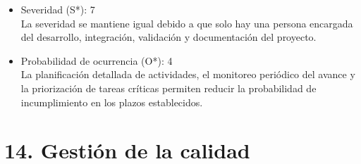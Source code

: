 \documentclass[
11pt, %
]{charter}
\begin{document}
\begin{itemize}
	\item Severidad (S*): 7 \\
	La severidad se mantiene igual debido a que solo hay una persona encargada del desarrollo, integración, validación y documentación del proyecto.
	
	\item Probabilidad de ocurrencia (O*): 4 \\
	La planificación detallada de actividades, el monitoreo periódico del avance y la priorización de tareas críticas permiten reducir la probabilidad de incumplimiento en los plazos establecidos. 
\end{itemize}

\section{14. Gestión de la calidad}
\label{sec:calidad}
\end{document}
